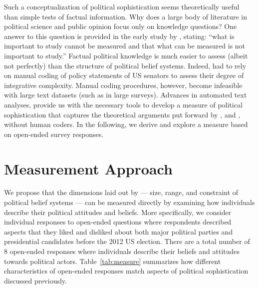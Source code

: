 \documentclass[12pt]{article}
\begin{document}
Such a conceptualization of political sophistication seems theoretically useful than simple tests of factual information. Why does a large body of literature in political science and public opinion focus only on knowledge questions? One answer to this question is provided in the early study by \citet[206]{converse1964nature}, stating: ``what is important to study cannot be measured and that what can be measured is not important to study.'' Factual political knowledge is much easier to assess (albeit not perfectly) than the structure of political belief systems. Indeed, \citet{tetlock1983cognitive} had to rely on manual coding of policy statements of US senators to assess their degree of integrative complexity. Manual coding procedures, however, become infeasible with large text datasets (such as in large surveys). Advances in automated text analyses, provide us with the necessary tools to develop a measure of political sophistication that captures the theoretical arguments put forward by \citet{converse1964nature}, \citet{tetlock1983cognitive} and \citet{luskin1987measuring}, without human coders. In the following, we derive and explore a measure based on open-ended survey responses.


\section{Measurement Approach}

We propose that the dimensions laid out by \citet{luskin1987measuring} --- size, range, and constraint of political belief systems --- can be measured directly by examining how individuals describe their political attitudes and beliefs. More specifically, we consider individual responses to open-ended questions where respondents described aspects that they liked and disliked about both major political parties and presidential candidates before the 2012 US election. There are a total number of 8 open-ended responses where individuals describe their beliefs and attitudes towards political actors. Table~\ref{tab:measure} summarizes how different characteristics of open-ended responses match aspects of political sophistication discussed previously.
\end{document}
